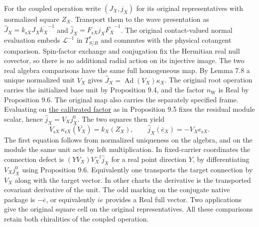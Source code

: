 \documentclass[
  english,
  11pt,
  reqno]{amsart}
\begin{document}
For the coupled operation write \((J_X,j_X)\) for its original
representatives with normalized square \(Z_X\). Transport them to the
wave presentation as
\(\widehat J_X=k_{\mathfrak cX}J_X\overline{k_X}^{-1}\) and
\(\widehat j_X=F_{\mathfrak cX}j_X\overline{F_X}^{-1}\). The original
contact-valued normal evaluation embeds \(\mathcal L^{-1}\) in
\(T^*_{S/B}\) and commutes with the physical cotangent comparison.
Spin-factor exchange and conjugation fix the Hermitian real null
covector, so there is no additional radial action on its injective
image. The two real algebra comparisons have the same full homogeneous
map. By Lemma 7.8 a unique normalized unit \(V_X\) gives
\(\widehat J_X=\operatorname{Ad}(V_X)\kappa_X\). The original root
operation carries the initialized base unit by Proposition 9.4, and the
factor \(n_{\mathrm W}\) is Real by Proposition 9.6. The original map
also carries the separately specified frame. Evaluating on
\hyperref[eq:analytic-factor-calibration]{the calibrated factor} as in
Proposition 9.5 fixes the residual module scalar, hence
\(\widehat j_X=V_X j_X^0\). The two squares then yield%
 \[
V_{\mathfrak c X}\,\kappa_{\mathfrak cX}(\overline{V_X})=k_X(Z_X),
\qquad
\widehat j_X(\overline e_X)=-V_X e_{\mathfrak c X}.
\] The first equation follows from normalized uniqueness on the algebra,
and on the module the same unit acts by left multiplication. In
fixed-carrier coordinates the connection defect is
\((YV_X)V_X^{-1}\widehat j_X\) for a real point direction \(Y\), by
differentiating \(V_Xj_X^0\) using Proposition 9.6. Equivalently one
transports the target connection by \(V_X\) along with the target
vector. In other charts the derivative is the transported covariant
derivative of the unit. The odd marking on the conjugate native package
is \(-\overline e\), or equivalently \(ie\) provides a Real full vector.
Two applications give the original square cell on the original
representatives. All these comparisons retain both chiralities of the
coupled operation.
\end{document}
